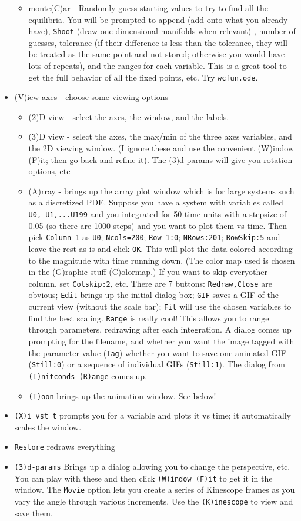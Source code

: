 \documentclass{article}
\begin{document}
\begin{itemize}
\begin{itemize}
\item monte(C)ar - Randomly guess starting values to try to find all the equilibria. You will be prompted to append (add onto what you already have), {\tt Shoot} (draw one-dimensional manifolds when relevant) ,  number of guesses, tolerance (if their difference is less than the tolerance, they will be treated as the same point and not stored; otherwise you would have lots of repeats), and the ranges for each variable. This is a great tool to get the full behavior of all the fixed points, etc. Try {\tt wcfun.ode}.
\end{itemize}
\item (V)iew axes - choose some viewing options
\begin{itemize}
\item (2)D view - select the axes, the window, and the labels.
\item (3)D view - select the axes, the max/min of the three axes variables, and the 2D viewing window. (I ignore these and use the convenient (W)indow (F)it; then go back and refine it). The (3)d params will give you rotation options, etc
\item (A)rray - brings up the array plot window which is for large systems such as a discretized PDE. Suppose you have a system with variables called {\tt U0, U1,...U199} and you integrated for 50 time units with a stepsize of 0.05 (so there are 1000 steps) and you  want to plot them vs time. Then pick {\tt Column 1} as {\tt U0}; {\tt Ncols=200}; {\tt Row 1:0}; {\tt NRows:201}; {\tt RowSkip:5} and leave the rest as is and click {\tt OK}. This will plot the data colored according to the magnitude with time running down. (The color map used is chosen in the (G)raphic stuff (C)olormap.)  If you want to skip everyother column, set {\tt Colskip:2}, etc. There are 7 buttons: {\tt Redraw,Close} are obvious; {\tt Edit} brings up the initial dialog box; {\tt GIF} saves a GIF of the current view (without the scale bar); {\tt Fit} will use the chosen variables to find the best scaling. {\tt Range} is really cool! This allows you to range through parameters, redrawing after each integration. A dialog comes up prompting for the filename, and whether you want the image tagged with the parameter value ({\tt Tag})  whether you want to save one animated GIF ({\tt Still:0}) or a sequence of individual GIFs ({\tt Still:1}). The dialog from {\tt (I)nitconds (R)ange} comes up.
\item {\tt (T)oon} brings up the animation window. See below!
\end{itemize}
\item {\tt (X)i vst t} prompts you for a variable and plots it vs time; it automatically scales the window.
\item {\tt Restore} redraws everything
\item {\tt (3)d-params} Brings up a dialog allowing you to change the perspective, etc. You can play with these and then click {\tt (W)indow (F)it} to get it in the window. The {\tt Movie} option lets you create a series of Kinescope frames as you vary the angle through various increments.  Use the {\tt (K)inescope} to view and save them.
\end{itemize}
\end{document}
